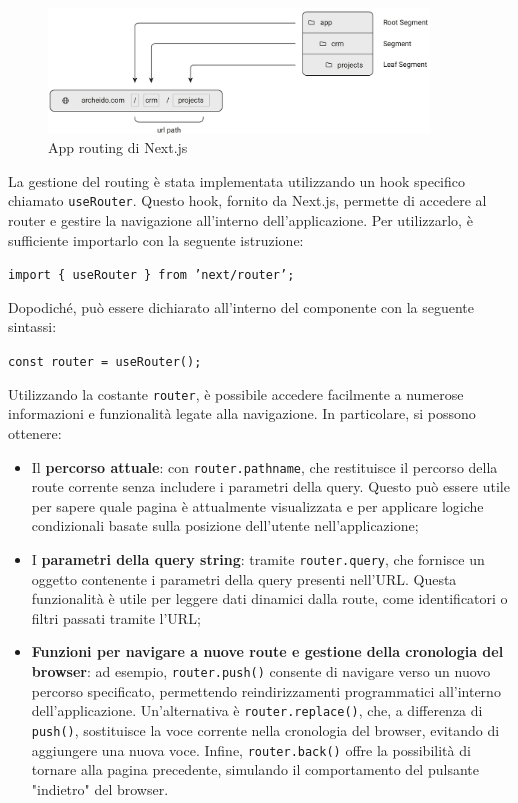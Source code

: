 \documentclass[target=bach,aauheader=,style=]{thud}
\begin{document}
\begin{figure}[H]
    \centering
    \includegraphics[width=0.9\textwidth]{img/routing.pdf} 
    \caption{App routing \cite{nextjsdocs2024} di Next.js}
\end{figure}

\noindent La gestione del routing è stata implementata utilizzando un hook specifico chiamato \texttt{useRouter}. Questo hook, fornito da Next.js, permette di accedere al router e gestire la navigazione all'interno dell'applicazione. Per utilizzarlo, è sufficiente importarlo con la seguente istruzione:

\begin{center}
    \texttt{import \{ useRouter \} from 'next/router';}
\end{center}

\noindent Dopodiché, può essere dichiarato all'interno del componente con la seguente sintassi:

\begin{center}
    \texttt{const router = useRouter();}
\end{center}

\noindent Utilizzando la costante \texttt{router}, è possibile accedere facilmente a numerose informazioni e funzionalità legate alla navigazione. In particolare, si possono ottenere:

\begin{itemize} 
    \item Il \textbf{percorso attuale}: con \texttt{router.pathname}, che restituisce il percorso della route corrente senza includere i parametri della query. Questo può essere utile per sapere quale pagina è attualmente visualizzata e per applicare logiche condizionali basate sulla posizione dell'utente nell'applicazione;
    \item I \textbf{parametri della query string}: tramite \texttt{router.query}, che fornisce un oggetto contenente i parametri della query presenti nell'URL. Questa funzionalità è utile per leggere dati dinamici dalla route, come identificatori o filtri passati tramite l'URL;
    \item \textbf{Funzioni per navigare a nuove route e gestione della cronologia del browser}: ad esempio, \texttt{router.push()} consente di navigare verso un nuovo percorso specificato, permettendo reindirizzamenti programmatici all'interno dell'applicazione. Un'alternativa è \texttt{router.replace()}, che, a differenza di \texttt{push()}, sostituisce la voce corrente nella cronologia del browser, evitando di aggiungere una nuova voce. Infine, \texttt{router.back()} offre la possibilità di tornare alla pagina precedente, simulando il comportamento del pulsante "indietro" del browser.
\end{itemize}
\end{document}
